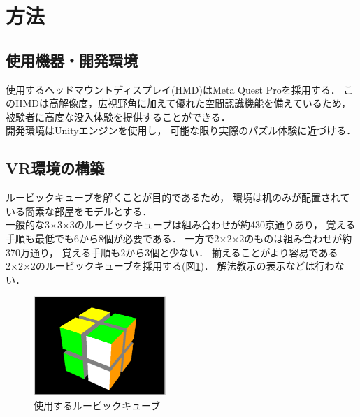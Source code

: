 \newpage
\section{方法}
  \subsection{使用機器・開発環境}
    使用するヘッドマウントディスプレイ(HMD)はMeta Quest Proを採用する．
    このHMDは高解像度，広視野角に加えて優れた空間認識機能を備えているため，
    被験者に高度な没入体験を提供することができる．
    \\\indent
    開発環境はUnityエンジンを使用し，
    可能な限り実際のパズル体験に近づける．
    \\\indent

  \subsection{VR環境の構築}
    ルービックキューブを解くことが目的であるため，
    環境は机のみが配置されている簡素な部屋をモデルとする．
    \\\indent
    一般的な3×3×3のルービックキューブは組み合わせが約430京通りあり，
    覚える手順も最低でも6から8個が必要である．
    一方で2×2×2のものは組み合わせが約370万通り，
    覚える手順も2から3個と少ない．
    揃えることがより容易である
    2×2×2のルービックキューブを採用する(図\ref{cube})．
    解法教示の表示などは行わない．
    \begin{figure}[h]
      \begin{center}
        \includegraphics[width=50mm]{./images/cube.png}
        \caption{使用するルービックキューブ}\label{cube}
      \end{center}
    \end{figure}
